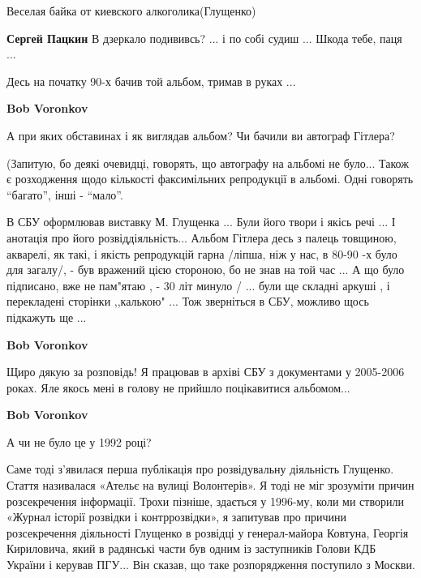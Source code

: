 \begin{itemize}
\begin{itemize}
\end{itemize} %

Веселая байка от киевского алкоголика(Глущенко)

\textbf{Сергей Пацкин} В дзеркало подививсь? ... і по собі судиш ... Шкода тебе, паця ...

Десь на початку 90-х бачив той альбом, тримав в руках ...

\begin{itemize} %
\textbf{Bob Voronkov} 

А при яких обставинах і як виглядав альбом? Чи бачили ви автограф Гітлера?

(Запитую, бо деякі очевидці, говорять, що автографу на альбомі не було... Також
є розходження щодо кількості факсимільних репродукції в альбомі. Одні говорять
\enquote{багато}, інші - \enquote{мало}.


В СБУ оформлював виставку М. Глущенка ... Були його твори і якісь речі ... І
анотація про його розвіддіяльність... Альбом Гітлера десь з палець товщиною,
акварелі, як такі, і якість репродукцій гарна /ліпша, ніж у нас, в 80-90 -х
було для загалу/, - був вражений цією стороною, бо не знав на той час ... А що
було підписано, вже не пам"ятаю , - 30 літ минуло / ... були ще складні аркуші
, і перекладені сторінки ,,калькою" ... Тож зверніться в СБУ, можливо щось
підкажуть ще ...

\begin{itemize} %
\textbf{Bob Voronkov} 

Щиро дякую за розповідь! Я працював в архіві СБУ з документами у 2005-2006
роках. Яле якось мені в голову не прийшло поцікавитися альбомом...


\textbf{Bob Voronkov} 

А чи не було це у 1992 році?

Саме тоді з'явилася перша публікація про розвідувальну діяльність Глущенко.
Стаття називалася «Ательє на вулиці Волонтерів». Я тоді не міг зрозуміти причин
розсекречення інформації. Трохи пізніше, здається у 1996-му, коли ми створили
«Журнал історії розвідки і контррозвідки», я запитував про причини
розсекречення діяльності Глущенко в розвідці у генерал-майора Ковтуна, Георгія
Кириловича, який в радянські части був одним із заступників Голови КДБ України
і керував ПГУ... Він сказав, що таке розпорядження поступило з Москви.



\end{itemize}
\end{itemize}
\end{itemize}
